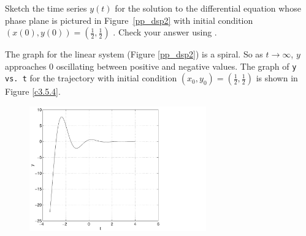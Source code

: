 \documentclass{ximera}
\begin{document}
\begin{computerExercise} \label{c3.5.4}
Sketch the time series $y(t)$ for the solution to the
differential equation whose phase plane is pictured in
Figure~\ref{pp_dsp2} with initial condition
$(x(0),y(0))=\left(\frac{1}{2},\frac{1}{2}\right)$ .  Check your answer
using {\pplane}.

\begin{solution}

The {\pplane} graph for the linear system (Figure \ref{pp_dsp2}) is
a spiral.  So as $t \rightarrow \infty$, $y$ approaches $0$ oscillating
between positive and negative values.  The graph of {\tt y vs.\ t} for the
trajectory with initial condition $(x_0,y_0) = \left(\frac{1}{2},
\frac{1}{2}\right)$ is shown in Figure \ref{c3.5.4}.

\begin{figure}[htb]
                       \centerline{%
                       \includegraphics[width=3.0in]{exfigure/3-5-4.pdf}}
\end{figure}

\end{solution}
\end{computerExercise}
\end{document}
